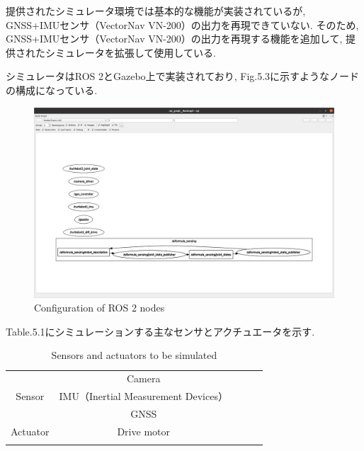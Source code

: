 \newpage

提供されたシミュレータ環境では基本的な機能が実装されているが, GNSS+IMUセンサ（VectorNav VN-200）の出力を再現できていない.
そのため, GNSS+IMUセンサ（VectorNav VN-200）の出力を再現する機能を追加して, 提供されたシミュレータを拡張して使用している.\cite{aifomrula-sim-chibakou}

シミュレータはROS 2とGazebo上で実装されており, Fig.5.3に示すようなノードの構成になっている.

\begin{figure}[H]
  \centering
 \includegraphics[keepaspectratio, scale=0.2]
      {images/rqt.png}
 \caption{Configuration of ROS 2 nodes}
 \label{fig:simulator}
\end{figure}

Table.5.1にシミュレーションする主なセンサとアクチュエータを示す.

\begin{table}[H]
  \centering
  \caption{Sensors and actuators to be simulated}
  \begin{tabular}{lclll}
  \cline{1-2}
  \multicolumn{1}{|l|}{}         & \multicolumn{1}{c|}{Camera}      &  &  &  \\
  \multicolumn{1}{|c|}{Sensor}   & \multicolumn{1}{c|}{IMU（Inertial Measurement Devices）} &  &  &  \\
  \multicolumn{1}{|l|}{}         & \multicolumn{1}{c|}{GNSS}        &  &  &  \\ \cline{1-2}
  \multicolumn{1}{|l|}{Actuator} & \multicolumn{1}{c|}{Drive motor} &  &  &  \\ \cline{1-2}
                                 & \multicolumn{1}{l}{}             &  &  & 
  \end{tabular}
\end{table}

